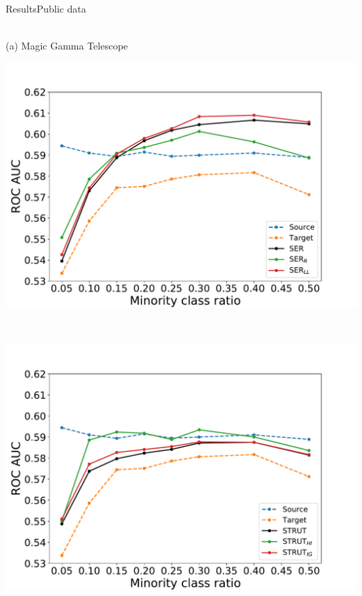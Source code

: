 \documentclass[8pt,t,aspectratio=1610]{beamer}
\newcommand{\ratio}{0.5}
\begin{document}
\begin{frame}[noframenumbering]{Results}{Public data}
\begin{minipage}[t]{0.33\linewidth}
\begin{minipage}[t]{\ratio\linewidth}
            \end{minipage}\\
            \medskip
            {\small(a)\; Magic Gamma Telescope}
        \end{minipage}\hfill
        \begin{minipage}[t]{0.33\linewidth}\vspace{0pt}
            \centering
            \begin{minipage}[t]{\ratio\linewidth}\vspace{0pt}
            \centerline{\includegraphics[width=\linewidth, trim={0 0 0 50}, clip]{SER_ll_05_Dataoffice_caltech_am_webcam_Scorefilescores_2020_02_17_8_BALANCESOURCE50_KFOLD5_NTARGET_NB_TREE1_BarPlot_AUC_depthNone.pdf}}
            \end{minipage}\\
            \begin{minipage}[t]{\ratio\linewidth}\vspace{0cm}
            \centerline{\includegraphics[width=\linewidth, trim={0 0 0 40}, clip]{STRUT_Dataoffice_caltech_am_webcam_Scorefilescores_2020_02_17_8_BALANCESOURCE50_KFOLD5_NTARGET_NB_TREE1_BarPlot_AUC_depthNone_ig.pdf}}

\end{minipage}
\end{minipage}
\end{frame}
\end{document}
